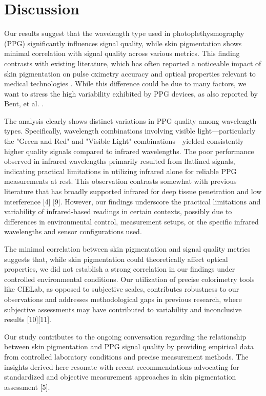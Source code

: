 \documentclass[letterpaper, 10 pt, conference]{ieeeconf}  %
\begin{document}
\section{Discussion}

Our results suggest that the wavelength type used in photoplethysmography (PPG) significantly influences signal quality, while skin pigmentation shows minimal correlation with signal quality across various metrics. This finding contrasts with existing literature, which has often reported a noticeable impact of skin pigmentation on pulse oximetry accuracy and optical properties relevant to medical technologies \cite{al-halawani_review_2023}\cite{setchfield_effect_2024}. While this difference could be due to many factors, we want to stress the high variability exhibited by PPG devices, as also reported by Bent, et al. \cite{bent_investigating_2020}. 

The analysis clearly shows distinct variations in PPG quality among wavelength types. Specifically, wavelength combinations involving visible light—particularly the "Green and Red" and "Visible Light" combinations—yielded consistently higher quality signals compared to infrared wavelengths. The poor performance observed in infrared wavelengths primarily resulted from flatlined signals, indicating practical limitations in utilizing infrared alone for reliable PPG measurements at rest. This observation contrasts somewhat with previous literature that has broadly supported infrared for deep tissue penetration and low interference [4] [9]. However, our findings underscore the practical limitations and variability of infrared-based readings in certain contexts, possibly due to differences in environmental control, measurement setups, or the specific infrared wavelengths and sensor configurations used.

The minimal correlation between skin pigmentation and signal quality metrics suggests that, while skin pigmentation could theoretically affect optical properties, we did not establish a strong correlation in our findings under controlled environmental conditions. Our utilization of precise colorimetry tools like CIELab, as opposed to subjective scales, contributes robustness to our observations and addresses methodological gaps in previous research, where subjective assessments may have contributed to variability and inconclusive results [10][11].

Our study contributes to the ongoing conversation regarding the relationship between skin pigmentation and PPG signal quality by providing empirical data from controlled laboratory conditions and precise measurement methods. The insights derived here resonate with recent recommendations advocating for standardized and objective measurement approaches in skin pigmentation assessment [5].
\end{document}
